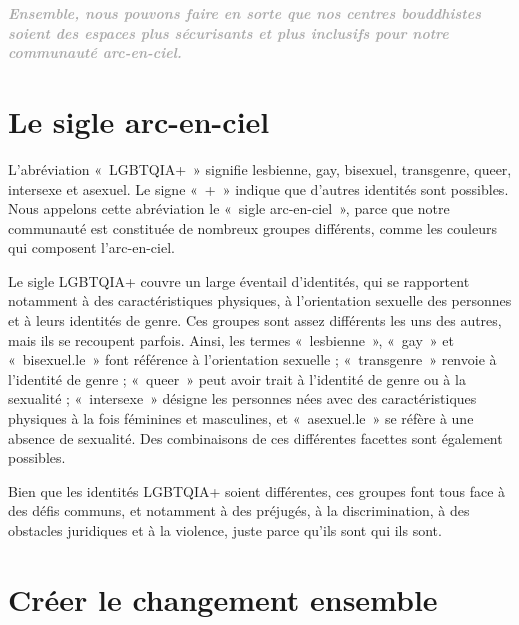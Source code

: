 \documentclass[12pt,openany]{book}
\renewenvironment{quote}{%
  \list{}{%
    \leftmargin-0.1cm   %
    \rightmargin\leftmargin
  }
  \item\relax
}
{\endlist}
\begin{document}
\smallskip

\begingroup
\begin{quote}
\centering
\doublespacing
\textit{\large \textbf{\textcolor{darkgray}{Ensemble, nous pouvons faire en sorte que nos centres bouddhistes soient des espaces plus sécurisants et plus inclusifs pour notre communauté arc-en-ciel.}}}
\end{quote}
\endgroup

\section*{Le sigle arc-en-ciel}

\noindent L’abréviation \mbox{« \mbox{LGBTQIA+} »} signifie lesbienne, gay, bisexuel, transgenre, queer, intersexe et asexuel. Le signe \mbox{« + »} indique que d’autres identités sont possibles. Nous appelons cette abréviation le \mbox{« s}igle arc-en-cie\mbox{l »}, parce que notre communauté est constituée de nombreux groupes différents, comme les couleurs qui composent l’arc-en-ciel.

Le sigle \mbox{LGBTQIA+} couvre un large éventail d’identités, qui se rapportent notamment à des caractéristiques physiques, à l’orientation sexuelle des personnes et à leurs identités de genre. Ces groupes sont assez différents les uns des autres, mais ils se recoupent parfois.
Ainsi, les termes \mbox{« lesbienne »}, \mbox{« gay »} et \mbox{« bisexuel.le »} font référence à l’orientation sexuelle ; \mbox{« transgenre »} renvoie à l’identité de genre ; \mbox{« queer »} peut avoir trait à l’identité de genre ou à la sexualité ; \mbox{« intersexe »} désigne les personnes nées avec des caractéristiques physiques à la fois féminines et masculines, et \mbox{« asexuel.le »} se réfère à une absence de sexualité. Des combinaisons de ces différentes facettes sont également possibles.

Bien que les identités \mbox{LGBTQIA+} soient différentes, ces groupes font tous face à des défis communs, et notamment à des préjugés, à la discrimination, à des obstacles juridiques et à la violence, juste parce qu’ils sont qui ils sont.

\section*{Créer le changement ensemble}
\end{document}
